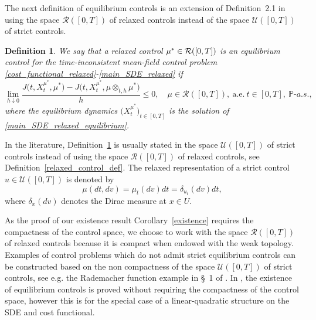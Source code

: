 \documentclass[12pt]{article}
\newtheorem{definition}[prop]{Definition}
\theoremstyle{named}
\numberwithin{equation}{section}
\let\oldcitet=\citet
\renewcommand{\cite}[1]{\textcolor[rgb]{0,0,1}{\oldcitet{#1}}}
\renewcommand{\citet}[1]{\textcolor[rgb]{0,0,1}{\oldcitet{#1}}}
\begin{document}
     The next definition of equilibrium controls
     is an extension of Definition~2.1 in \cite{hu2012time}
     using the space $\mathcal{R}([0,T])$
     of relaxed controls instead
     of the space $\mathcal{U}([0,T])$ of strict controls.
\begin{definition} \label{equilibrium_control_relaxed}
  We say that a relaxed control $\mu^* \in {\cal R}([0,T])$
  is an equilibrium control for the time-inconsistent mean-field control problem \eqref{cost_functional_relaxed}-\eqref{main_SDE_relaxed} if
 \begin{equation}\label{eq:equilibrium_control_relaxed}
\lim\limits_{h \downarrow 0} \frac{J\big(t,X^{\mu^*}_t,\mu^*\big) - J\big(t,X^{\mu^*}_t,\mu \otimes_{t,h} \mu^*\big)}{h} \leq 0,
\quad
\mu \in \mathcal{R}([0,T]), \ \mbox{a.e.} \ t \in [0,T], \ \mathbb{P}\mbox{-}a.s.,
\end{equation}
 where the equilibrium dynamics
 $\big( X^{\mu^*}_t\big)_{t\in [0,T]}$ is
    the
solution of
 \eqref{main_SDE_relaxed_equilibrium}.
\end{definition}
\noindent
 In the literature,
 Definition~\ref{equilibrium_control_relaxed}
 is usually stated in the space $\mathcal{U}([0,T])$ of strict controls
 instead of using the space $\mathcal{R}([0,T])$
 of relaxed controls, see Definition~\ref{relaxed_control_def}.
The relaxed representation of a strict control $u \in \mathcal{U}([0,T])$
is denoted by
\begin{equation}
    \label{relaxed_control_representation}
    \mu(dt,dv) = \mu_t (dv) dt = \delta_{u_t}(dv) dt,
\end{equation}
 where $\delta_x(dv)$ denotes the Dirac measure at $x\in U$.

\medskip

 As the proof of our existence result Corollary~\ref{existence}
 requires the compactness of the control space,
 we choose to work with the space $\mathcal{R}([0,T])$ of relaxed controls
 because it is compact when endowed with the weak topology.
 Examples of control problems which do not admit
 strict equilibrium controls can be constructed based on
 the non compactness of the space $\mathcal{U}([0,T])$ of strict controls,
 see e.g. the Rademacher function example in
 \S~1 of \cite{valadier1994course}.
     In \cite{hu2012time,hu2017time},
     the existence of equilibrium controls is proved
     without requiring the compactness of the control space,
     however this is for the special case of a linear-quadratic structure
     on the SDE and cost functional.
\end{document}
